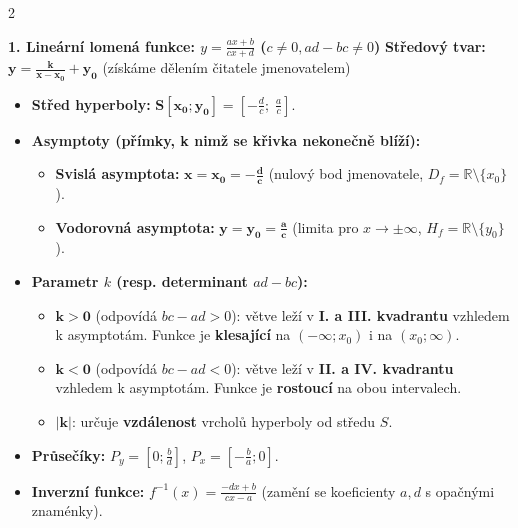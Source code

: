 \documentclass[9pt,a4paper]{article}
\begin{document}
\begin{tcolorbox}[secbox,title=OKRUH 6: LINEÁRNÍ LOMENÁ FUNKCE A MOCNINNÉ FUNKCE -- PARAMETRY A GRAFY]
\begin{multicols}{2}

\textbf{\large 1. Lineární lomená funkce: $y = \frac{ax + b}{cx + d}$ ($c \neq 0, ad - bc \neq 0$)}
\textbf{Středový tvar:} $\mathbf{y = \frac{k}{x - x_0} + y_0}$ (získáme dělením čitatele jmenovatelem)
\begin{itemize}
  \item \textbf{Střed hyperboly:} $\mathbf{S[x_0; y_0]} = \left[-\frac{d}{c};\; \frac{a}{c}\right]$.
  \item \textbf{Asymptoty (přímky, k nimž se křivka nekonečně blíží):}
  \begin{itemize}
    \item \textbf{Svislá asymptota:} $\mathbf{x = x_0 = -\frac{d}{c}}$ (nulový bod jmenovatele, $D_f = \mathbb{R} \setminus \{x_0\}$).
    \item \textbf{Vodorovná asymptota:} $\mathbf{y = y_0 = \frac{a}{c}}$ (limita pro $x \to \pm\infty$, $H_f = \mathbb{R} \setminus \{y_0\}$).
  \end{itemize}
  \item \textbf{Parametr $k$ (resp. determinant $ad - bc$):}
  \begin{itemize}
    \item $\mathbf{k > 0}$ (odpovídá $bc - ad > 0$): větve leží v \textbf{I. a III. kvadrantu} vzhledem k asymptotám. Funkce je \textbf{klesající} na $(-\infty; x_0)$ i na $(x_0; \infty)$.
    \item $\mathbf{k < 0}$ (odpovídá $bc - ad < 0$): větve leží v \textbf{II. a IV. kvadrantu} vzhledem k asymptotám. Funkce je \textbf{rostoucí} na obou intervalech.
    \item $\mathbf{|k|}$: určuje \textbf{vzdálenost} vrcholů hyperboly od středu $S$.
  \end{itemize}
  \item \textbf{Průsečíky:} $P_y = \left[0; \frac{b}{d}\right]$, $P_x = \left[-\frac{b}{a}; 0\right]$.
  \item \textbf{Inverzní funkce:} $f^{-1}(x) = \frac{-dx + b}{cx - a}$ (zamění se koeficienty $a, d$ s opačnými znaménky).
\end{itemize}


\end{multicols}
\end{tcolorbox}
\end{document}
